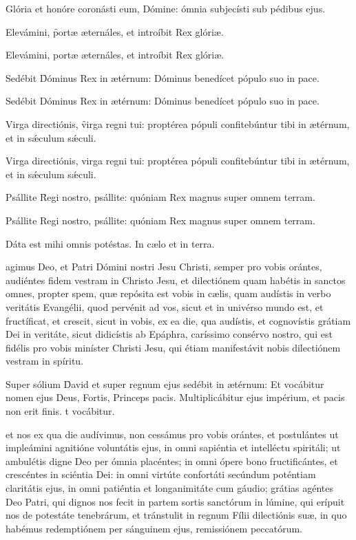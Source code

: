 \documentclass[fontsize=8pt,paper=A6,twoside,BCOR=1mm,DIV=22,headinclude]{scrarticle}
\begin{document}
\begin{multicols}{2}
{

\A Glória et honóre coronásti eum, Dómine: ómnia subjecísti sub pédibus ejus.

\A Elevámini, \f portæ æternáles, et introíbit Rex glóriæ.



\A Elevámini, portæ æternáles, et introíbit Rex glóriæ.

\A Sedébit \f Dóminus Rex in ætérnum: Dóminus benedícet pópulo suo in pace.



\A Sedébit Dóminus Rex in ætérnum: Dóminus benedícet pópulo suo in pace.

\A Virga directiónis, \f virga regni tui: proptérea pópuli confitebúntur tibi in ætérnum, et in sǽculum sǽculi.



\A Virga directiónis, virga regni tui: proptérea pópuli confitebúntur tibi in ætérnum, et in sǽculum sǽculi.

\A Psállite \f Regi nostro, psállite: quóniam Rex magnus super omnem terram.



\A Psállite Regi nostro, psállite: quóniam Rex magnus super omnem terram.

}

\V Dáta est mihi omnis potéstas.
\R In cælo et in terra.

{
 agimus Deo, et Patri Dómini nostri Jesu Christi, semper pro vobis orántes, audiéntes fidem vestram in Christo Jesu, et dilectiónem quam habétis in sanctos omnes, propter spem, quæ repósita est vobis in cælis, quam audístis in verbo veritátis Evangélii, quod pervénit ad vos, sicut et in univérso mundo est, et fructíficat, et crescit, sicut in vobis, ex ea die, qua audístis, et cognovístis grátiam Dei in veritáte, sicut didicístis ab Epáphra, caríssimo consérvo nostro, qui est fidélis pro vobis miníster Christi Jesu, qui étiam manifestávit nobis dilectiónem vestram in spíritu.

\R Super sólium \f David et super regnum ejus sedébit in ætérnum:
\red{*} Et vocábitur nomen ejus Deus, Fortis, Princeps pacis.
\V Multiplicábitur ejus impérium, et pacis non erit finis.
t vocábitur.

 et nos ex qua die audívimus, non cessámus pro vobis orántes, et postulántes ut impleámini agnitióne voluntátis ejus, in omni sapiéntia et intelléctu spiritáli; ut ambulétis digne Deo per ómnia placéntes; in omni ópere bono fructificántes, et crescéntes in sciéntia Dei: in omni virtúte confortáti secúndum poténtiam claritátis ejus, in omni patiéntia et longanimitáte cum gáudio; grátias agéntes Deo Patri, qui dignos nos fecit in partem sortis sanctórum in lúmine, qui erípuit nos de potestáte tenebrárum, et tránstulit in regnum Fílii dilectiónis suæ, in quo habémus redemptiónem per sánguinem ejus, remissiónem peccatórum.

}
\end{multicols}
\end{document}
